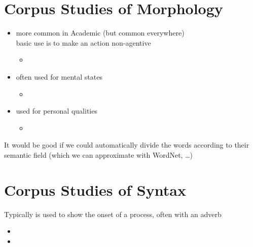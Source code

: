 \documentclass[a4paper,landscape,headrule,footrule,dvips]{foils}
\begin{document}
\begin{CJK}{UTF8}{min}
\section{Corpus Studies of Morphology}


\begin{itemize}
\item  {} more common in Academic (but common everywhere)
  \\ basic use is to make an action non-agentive
  \begin{itemize}
  \item {}
  \end{itemize}
\item {} often used for mental states
  \\  
  \begin{itemize}
  \item {} 
  \end{itemize}
\item {} used for personal qualities
  \\  
  \begin{itemize}
  \item {}
  \end{itemize}
\end{itemize}

It would be good if we could automatically divide the words according
to their semantic field (which we can approximate with WordNet, \ldots)

\section{Corpus Studies of Syntax}
\MyLogo{}

Typically  is used to show the onset of a process, often
with an adverb
\begin{itemize}
\item {}
\item {}
\end{itemize}


\end{CJK}
\end{document}
